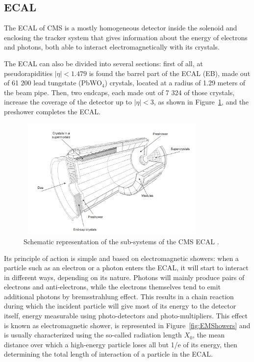 \documentclass[a4paper, 10pt, openright]{report}
\begin{document}
\subsection{\acf{ECAL}} \label{subsection:ECAL}

The \ac{ECAL} of CMS is a mostly homogeneous detector inside the solenoid and enclosing the tracker system that gives information about the energy of electrons and photons, both able to interact electromagnetically with its crystals.

The \ac{ECAL} can also be divided into several sections: first of all, at pseudorapidities $|\eta| < 1.479$ is found the barrel part of the \ac{ECAL} (EB), made out of 61 200 lead tungstate (PbWO$_4$) crystals, located at a radius of 1.29 meters of the beam pipe. Then, two endcaps, each made out of 7 324 of those crystals, increase the coverage of the detector up to $|\eta| < 3$, as shown in Figure~\ref{fig:CMSECAL}, and the preshower completes the \ac{ECAL}.

\begin{figure}[htbp]
\begin{center}
\includegraphics[width=9.5cm, height=6cm]{figs/CMSEcal.png}
\caption{Schematic representation of the sub-systems of the \ac{CMS} \ac{ECAL} \cite{CMSDescription}.}
\label{fig:CMSECAL}
\end{center}
\end{figure}

Its principle of action is simple and based on electromagnetic showers: when a particle such as an electron or a photon enters the \ac{ECAL}, it will start to interact in different ways, depending on its nature. Photons will mainly produce pairs of electrons and anti-electrons, while the electrons themselves tend to emit additional photons by bremsstrahlung effect. This results in a chain reaction during which the incident particle will give most of its energy to the detector itself, energy measurable using photo-detectors and photo-multipliers. This effect is known as electromagnetic shower, is represented in Figure~\ref{fig:EMShowers} and is usually characterized using the so-called radiation length $X_0$, the mean distance over which a high-energy particle loses all but 1/e of its energy, then determining the total length of interaction of a particle in the \ac{ECAL}. 
\end{document}
